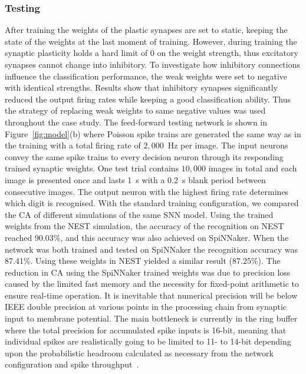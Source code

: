 \subsubsection{Testing}
After training the weights of the plastic synapses are set to static, keeping the state of the weights at the last moment of training.
However, during training the synaptic plasticity holds a hard limit of 0 on the weight strength, thus excitatory synapses cannot change into inhibitory.
To investigate how inhibitory connections influence the classification performance, the weak weights were set to negative with identical strengths.
Results show that inhibitory synapses significantly reduced the output firing rates while keeping a good classification ability.
Thus the strategy of replacing weak weights to same negative values was used throughout the case study.
The feed-forward testing network is shown in Figure~\ref{fig:model}(b) where Poisson spike trains are generated the same way as in the training with a total firing rate of $2,000$~Hz per image.
The input neurons convey the same spike trains to every decision neuron through its responding trained synaptic weights. 
One test trial contains $10,000$ images in total and each image is presented once and lasts 1~s with a 0.2~s blank period between consecutive images.
The output neuron with the highest firing rate determines which digit is recognised.
With the standard training configuration, we compared the CA of different simulations of the same SNN model.
Using the trained weights from the NEST simulation, the accuracy of the recognition on NEST reached 90.03\%, and this accuracy was also achieved on SpiNNaker.
When the network was both trained and tested on SpiNNaker the recognition accuracy was 87.41\%.
Using these weights in NEST yielded a similar result (87.25\%). 
The reduction in CA using the SpiNNaker trained weights was due to precision loss caused by the limited fast memory and the necessity for fixed-point arithmetic to ensure real-time operation.
It is inevitable that numerical precision will be below IEEE double precision at various points in the processing chain from synaptic input to membrane potential.
The main bottleneck is currently in the ring buffer where the total precision for accumulated spike inputs is 16-bit, meaning that individual spikes are realistically going to be limited to 11- to 14-bit depending upon the probabilistic headroom calculated as necessary from the network configuration and spike throughput~\cite{Hopkins2015Accuracy}.

